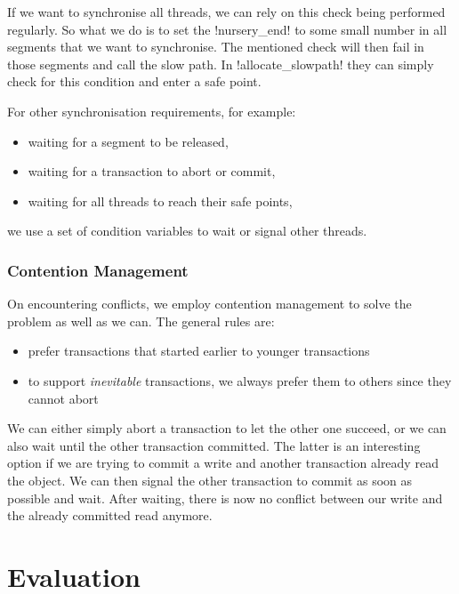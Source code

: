 \documentclass{sigplanconf}
\makeatletter
\renewcommand\lstinline[1][]{%
  \Collectverb{\@@myverb}%
}
\def\@@myverb#1{%
    \begingroup
    \fboxsep=0.2em
    \colorbox{verylightgray}{\oldlstinline|#1|}%
    \endgroup
}
\makeatother
\begin{document}
If we want to synchronise all threads, we can rely on this check being
performed regularly. So what we do is to set the
\lstinline!nursery_end!  to some small number in all segments that we
want to synchronise. The mentioned check will then fail in those
segments and call the slow path. In \lstinline!allocate_slowpath!
they can simply check for this condition and enter a safe point.

For other synchronisation requirements, for example:
\begin{itemize}[noitemsep]
\item waiting for a segment to be released,
\item waiting for a transaction to abort or commit,
\item waiting for all threads to reach their safe points,
\end{itemize}
we use a set of condition variables to wait or signal other threads.


\subsubsection{Contention Management\label{subsub:contentionmanagement}}

On encountering conflicts, we employ contention management to solve
the problem as well as we can. The general rules are:
\begin{itemize}[noitemsep]
\item prefer transactions that started earlier to younger transactions
\item to support \emph{inevitable} transactions, we always prefer them
  to others since they cannot abort
\end{itemize}
We can either simply abort a transaction to let the other one succeed,
or we can also wait until the other transaction committed. The latter
is an interesting option if we are trying to commit a write and
another transaction already read the object. We can then signal the
other transaction to commit as soon as possible and wait. After
waiting, there is now no conflict between our write and the already
committed read anymore.



\section{Evaluation}
\end{document}
